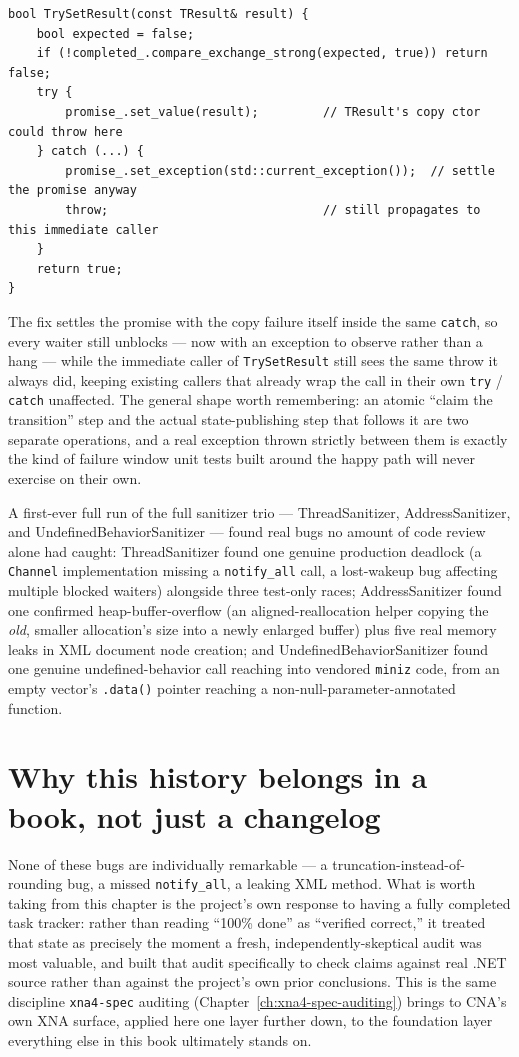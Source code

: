 \begin{lstlisting}
bool TrySetResult(const TResult& result) {
    bool expected = false;
    if (!completed_.compare_exchange_strong(expected, true)) return false;
    try {
        promise_.set_value(result);         // TResult's copy ctor could throw here
    } catch (...) {
        promise_.set_exception(std::current_exception());  // settle the promise anyway
        throw;                              // still propagates to this immediate caller
    }
    return true;
}
\end{lstlisting}

The fix settles the promise with the copy failure itself inside the same \texttt{catch}, so
every waiter still unblocks --- now with an exception to observe rather than a hang --- while
the immediate caller of \texttt{TrySetResult} still sees the same throw it always did, keeping
existing callers that already wrap the call in their own \texttt{try} / \texttt{catch} unaffected.
The general shape worth remembering: an atomic ``claim the transition'' step and the actual
state-publishing step that follows it are two separate operations, and a real exception thrown
strictly between them is exactly the kind of failure window unit tests built around the happy
path will never exercise on their own.

A first-ever full run of the full sanitizer trio --- ThreadSanitizer, AddressSanitizer, and
UndefinedBehaviorSanitizer --- found real bugs no amount of code review alone had caught:
ThreadSanitizer found one genuine production deadlock (a \texttt{Channel} implementation
missing a \texttt{notify\_all} call, a lost-wakeup bug affecting multiple blocked waiters)
alongside three test-only races; AddressSanitizer found one confirmed heap-buffer-overflow (an
aligned-reallocation helper copying the \emph{old}, smaller allocation's size into a newly
enlarged buffer) plus five real memory leaks in XML document node creation; and
UndefinedBehaviorSanitizer found one genuine undefined-behavior call reaching into vendored
\texttt{miniz} code, from an empty vector's \texttt{.data()} pointer reaching a
non-null-parameter-annotated function.

\section{Why this history belongs in a book, not just a changelog}

None of these bugs are individually remarkable --- a truncation-instead-of-rounding bug, a
missed \texttt{notify\_all}, a leaking XML method. What is worth taking from this chapter is
the project's own response to having a fully completed task tracker: rather than reading
``100\% done'' as ``verified correct,'' it treated that state as precisely the moment a fresh,
independently-skeptical audit was most valuable, and built that audit specifically to check
claims against real .NET source rather than against the project's own prior conclusions. This
is the same discipline \texttt{xna4-spec} auditing (Chapter~\ref{ch:xna4-spec-auditing})
brings to CNA's own XNA surface, applied here one layer further down, to the foundation layer
everything else in this book ultimately stands on.

